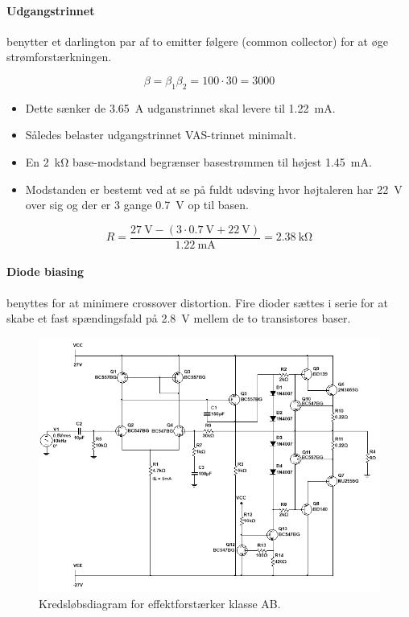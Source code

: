 \documentclass[danish]{article}
\begin{document}
\paragraph{Udgangstrinnet} benytter et darlington par af to emitter følgere (common collector) for at øge strømforstærkningen. 

\begin{equation}
\beta = \beta_1 \beta_2 = 100 {\cdot} 30 = 3000
\end{equation}

\begin{itemize}
	\item Dette sænker de \SI{3.65}{\ampere} udganstrinnet skal levere til \SI{1.22}{\milli\ampere}.
	\item Således belaster udgangstrinnet VAS-trinnet minimalt.
	\item En \SI{2}{\kilo\ohm} base-modstand begrænser basestrømmen til højest \SI{1.45}{\milli\ampere}.
	\item Modstanden er bestemt ved at se på fuldt udsving hvor højtaleren har \SI{22}{\volt} over sig og der er 3 gange \SI{0.7}{\volt} op til basen.
\end{itemize}

\begin{equation}
R = \dfrac{\SI{27}{\volt} − (3 \cdot \SI{0.7}{\volt} + \SI{22}{\volt})}{\SI{1.22}{\milli\ampere}} = \SI{2.38}{\kilo\ohm}
\end{equation}

\paragraph{Diode biasing} benyttes for at minimere crossover distortion. Fire dioder sættes i serie for at skabe et fast spændingsfald på \SI{2.8}{\volt} mellem de to transistores baser. 

\begin{figure} [H]
	\centering
	\includegraphics[width=\linewidth]{graphics/PowerAmp_schematic}
	\caption{Kredsløbsdiagram for effektforstærker klasse AB.}
	\label{fig:PowerAmp_schematic}
\end{figure}
\end{document}
